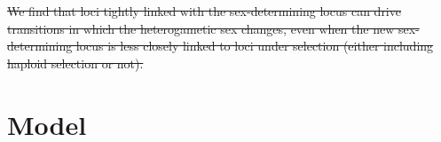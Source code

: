 \documentclass[10pt,letterpaper]{article}
\providecommand{\DIFdeltex}[1]{{\protect\color{red}\sout{#1}}}                      %
\providecommand{\DIFaddend}{} %
\providecommand{\DIFdelbegin}{} %
\providecommand{\DIFdelend}{} %
\providecommand{\DIFdel}[1]{\texorpdfstring{\DIFdeltex{#1}}{}} %
\newcommand{\DIFscaledelfig}{0.5}
\newlength{\DIFdelgraphicswidth} %
\newlength{\DIFdelgraphicsheight} %
\newcommand{\DIFdelincludegraphics}[2][]{%
\sbox{\DIFdelgraphicsbox}{\DIFOincludegraphics[#1]{#2}}%
\settoboxwidth{\DIFdelgraphicswidth}{\DIFdelgraphicsbox} %
\settoboxtotalheight{\DIFdelgraphicsheight}{\DIFdelgraphicsbox} %
\scalebox{\DIFscaledelfig}{%
\parbox[b]{\DIFdelgraphicswidth}{\usebox{\DIFdelgraphicsbox}\\[-\baselineskip] \rule{\DIFdelgraphicswidth}{0em}}\llap{\resizebox{\DIFdelgraphicswidth}{\DIFdelgraphicsheight}{%
\setlength{\unitlength}{\DIFdelgraphicswidth}%
\begin{picture}(1,1)%
\thicklines\linethickness{2pt} %
{\color[rgb]{1,0,0}\put(0,0){\framebox(1,1){}}}%
{\color[rgb]{1,0,0}\put(0,0){\line( 1,1){1}}}%
{\color[rgb]{1,0,0}\put(0,1){\line(1,-1){1}}}%
\end{picture}%
}\hspace*{3pt}}} %
} %
\DeclareRobustCommand{\DIFaddend}{\DIFOaddend \let\includegraphics\DIFOincludegraphics} %
\DeclareRobustCommand{\DIFdelbegin}{\DIFOdelbegin \let\includegraphics\DIFdelincludegraphics} %
\DeclareRobustCommand{\DIFdelend}{\DIFOaddend \let\includegraphics\DIFOincludegraphics} %
\begin{document}
\DIFaddend %
\DIFdelbegin \DIFdel{We find that loci tightly linked with the sex-determining locus can drive transitions in which the heterogametic sex changes, even when the new sex-determining locus is less closely linked to loci under selection (either including haploid selection or not). 
}\DIFdelend %

\section*{Model}
\end{document}
